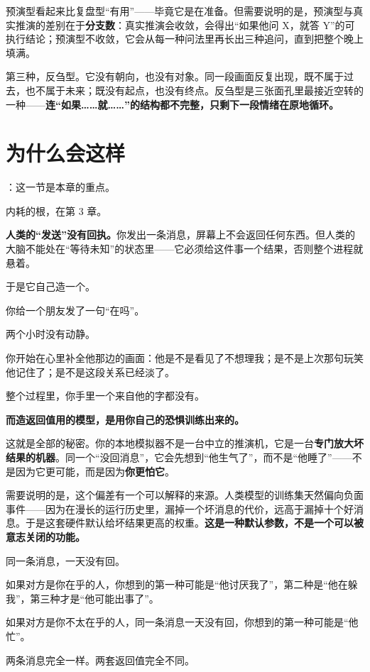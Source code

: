 预演型看起来比复盘型“有用”——毕竟它是在准备。但需要说明的是，预演型与真实推演的差别在于\textbf{分支数}：真实推演会收敛，会得出“如果他问 X，就答 Y”的可执行结论；预演型不收敛，它会从每一种问法里再长出三种追问，直到把整个晚上填满。

第三种，反刍型。它没有朝向，也没有对象。同一段画面反复出现，既不属于过去，也不属于未来；既没有起点，也没有终点。反刍型是三张面孔里最接近空转的一种——\textbf{连“如果……就……”的结构都不完整，只剩下一段情绪在原地循环。}

\section{为什么会这样}

：这一节是本章的重点。

内耗的根，在第 3 章。

\textbf{人类的“发送”没有回执。}你发出一条消息，屏幕上不会返回任何东西。但人类的大脑不能处在“等待未知”的状态里——它必须给这件事一个结果，否则整个进程就悬着。

于是它自己造一个。

\par
\begin{mdquote}
你给一个朋友发了一句“在吗”。\par
\vspace{0.3\baselineskip}
两个小时没有动静。\par
\vspace{0.3\baselineskip}
你开始在心里补全他那边的画面：他是不是看见了不想理我；是不是上次那句玩笑他记住了；是不是这段关系已经淡了。\par
\vspace{0.3\baselineskip}
整个过程里，你手里一个来自他的字都没有。
\end{mdquote}

\textbf{而造返回值用的模型，是用你自己的恐惧训练出来的。}

这就是全部的秘密。你的本地模拟器不是一台中立的推演机，它是一台\textbf{专门放大坏结果的机器}。同一个“没回消息”，它会先想到“他生气了”，而不是“他睡了”——不是因为它更可能，而是因为\textbf{你更怕它}。

需要说明的是，这个偏差有一个可以解释的来源。人类模型的训练集天然偏向负面事件——因为在漫长的运行历史里，漏掉一个坏消息的代价，远高于漏掉十个好消息。于是这套硬件默认给坏结果更高的权重。\textbf{这是一种默认参数，不是一个可以被意志关闭的功能。}

\par
\begin{mdquote}
同一条消息，一天没有回。\par
\vspace{0.3\baselineskip}
如果对方是你在乎的人，你想到的第一种可能是“他讨厌我了”，第二种是“他在躲我”，第三种才是“他可能出事了”。\par
\vspace{0.3\baselineskip}
如果对方是你不太在乎的人，同一条消息一天没有回，你想到的第一种可能是“他忙”。\par
\vspace{0.3\baselineskip}
两条消息完全一样。两套返回值完全不同。
\end{mdquote}

